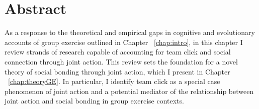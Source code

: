 \chapter*{Abstract}


As a response to the theoretical and empirical gaps in cognitive and evolutionary accounts of group exercise outlined in Chapter ~\ref{chap:intro}, in this chapter I review strands of research capable of accounting for team click and social connection through joint action. This review sets the foundation for a novel theory of social bonding through joint action, which I present in Chapter ~\ref{chap:theoryGE}.  In particular, I identify team click as a special case phenomenon of joint action and a potential mediator of the relationship between joint action and social bonding in group exercise contexts.




